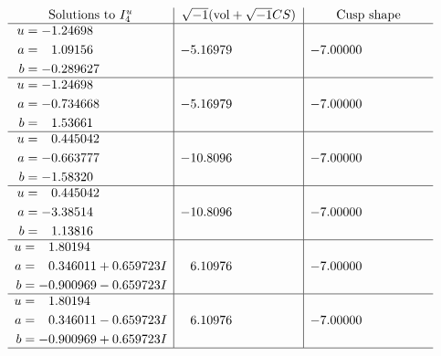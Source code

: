 \documentclass[1p]{elsarticle_modified}
\theoremstyle{definition}
\newcommand{\I}{\sqrt{-1}}
\begin{document}
$$\begin{array}{c|c|c}  
\text{Solutions to }I^u_{4}& \I (\text{vol} + \sqrt{-1}CS) & \text{Cusp shape}\\
 \hline 
\begin{aligned}
u &= -1.24698\phantom{ +0.000000I} \\
a &= \phantom{-}1.09156\phantom{ +0.000000I} \\
b &= -0.289627\phantom{ +0.000000I}\end{aligned}
 & -5.16979\phantom{ +0.000000I} & -7.00000\phantom{ +0.000000I} \\ \hline\begin{aligned}
u &= -1.24698\phantom{ +0.000000I} \\
a &= -0.734668\phantom{ +0.000000I} \\
b &= \phantom{-}1.53661\phantom{ +0.000000I}\end{aligned}
 & -5.16979\phantom{ +0.000000I} & -7.00000\phantom{ +0.000000I} \\ \hline\begin{aligned}
u &= \phantom{-}0.445042\phantom{ +0.000000I} \\
a &= -0.663777\phantom{ +0.000000I} \\
b &= -1.58320\phantom{ +0.000000I}\end{aligned}
 & -10.8096\phantom{ +0.000000I} & -7.00000\phantom{ +0.000000I} \\ \hline\begin{aligned}
u &= \phantom{-}0.445042\phantom{ +0.000000I} \\
a &= -3.38514\phantom{ +0.000000I} \\
b &= \phantom{-}1.13816\phantom{ +0.000000I}\end{aligned}
 & -10.8096\phantom{ +0.000000I} & -7.00000\phantom{ +0.000000I} \\ \hline\begin{aligned}
u &= \phantom{-}1.80194\phantom{ +0.000000I} \\
a &= \phantom{-}0.346011 + 0.659723 I \\
b &= -0.900969 - 0.659723 I\end{aligned}
 & \phantom{-}6.10976\phantom{ +0.000000I} & -7.00000\phantom{ +0.000000I} \\ \hline\begin{aligned}
u &= \phantom{-}1.80194\phantom{ +0.000000I} \\
a &= \phantom{-}0.346011 - 0.659723 I \\
b &= -0.900969 + 0.659723 I\end{aligned}
 & \phantom{-}6.10976\phantom{ +0.000000I} & -7.00000\phantom{ +0.000000I}\\
 \hline 
 \end{array}$$\newpage
\end{document}
